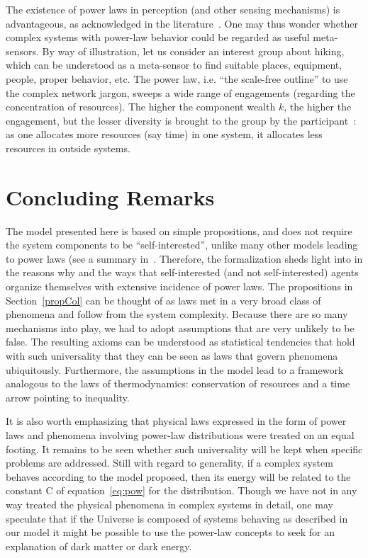 \documentclass[10pt,letterpaper]{article}
\begin{document}
The existence of power laws in perception (and other sensing mechanisms) is advantageous, as acknowledged in the literature~\cite{psycho}. One may thus wonder whether complex systems with power-law behavior could be regarded as useful meta-sensors. By way of illustration, let us consider an interest group about hiking, which can be understood as a meta-sensor to find suitable 
places, equipment, people, proper behavior, etc.
The power law, i.e. ``the scale-free outline'' to use
the complex network jargon, sweeps a wide range of engagements (regarding the concentration of resources).
The higher the component wealth $k$, the higher the engagement,
but the lesser diversity is brought to the group
by the participant~\cite{tStable}: as one allocates more resources (say time) in one system, it allocates less resources in outside systems.

\section{Concluding Remarks}
The model presented here is based on simple propositions, and does not require the system components to be ``self-interested'',
unlike many other models leading to power laws (see a summary in~\cite{newmanpower,part}. Therefore, the formalization sheds light into in the reasons why and the ways that self-interested (and not self-interested) agents organize themselves with extensive incidence of power laws. The propositions in Section~\ref{propCol} can be thought of as laws met in a very broad class of phenomena and follow from the system complexity. Because there are so many mechanisms into play, we had to adopt assumptions that are very unlikely to be false. The resulting axioms can be understood as statistical tendencies that hold with such universality that they can be seen as laws that govern phenomena ubiquitously. 
Furthermore, the assumptions in the model lead to a framework analogous to the laws of thermodynamics:
conservation of resources and a time arrow pointing to inequality.

It is also worth emphasizing that physical laws expressed in the form of power laws and phenomena involving power-law distributions were treated on an equal footing. It remains to be seen whether such universality will be kept when specific problems are addressed. Still with regard to generality, if a complex system behaves according to the model proposed, then its energy will be related to the constant C of equation~\ref{eq:pow} for the distribution. Though we have not in any way treated the physical phenomena in complex systems in detail, one may speculate that if the Universe is composed of systems behaving as described in our model it might be possible to use the power-law concepts to seek for an explanation of dark matter or dark energy. 
\end{document}
